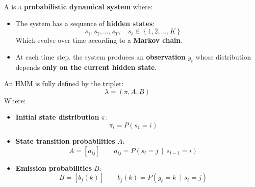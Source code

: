 \begin{definitionbox}\label{def:hidden-markov-model}
    A  is a \textbf{probabilistic dynamical system} where:
    \begin{itemize}
        \item The system has a sequence of \textbf{hidden states}:
        \begin{equation*}
            s_1, s_2, \ldots, s_T, \quad s_t \in \left\{1, 2, \ldots, K\right\}
        \end{equation*}
        Which evolve over time according to a \textbf{Markov chain}.
        \item At each time step, the system produces an \textbf{observation} $y_t$ whose distribution depends \textbf{only on the current hidden state}.
    \end{itemize}
    An HMM is fully defined by the triplet:
    \begin{equation}
        \lambda = \left(\pi, A, B\right)
    \end{equation}
    Where:
    \begin{itemize}
        \item \textbf{Initial state distribution} $\pi$:
        \begin{equation}
            \pi_i = P\left(s_1 = i\right)
        \end{equation}
        \item \textbf{State transition probabilities} $A$:
        \begin{equation}
            A = \left[a_{ij}\right] \qquad a_{ij} = P\left(s_{t} = j \, \mid \, s_{t-1} = i\right)
        \end{equation}
        \item \textbf{Emission probabilities} $B$:
        \begin{equation}
            B = \left[b_{j}(k)\right] \qquad b_{j}(k) = P\left(y_t = k \, \mid \, s_t = j\right)
        \end{equation}
    \end{itemize}
\end{definitionbox}

